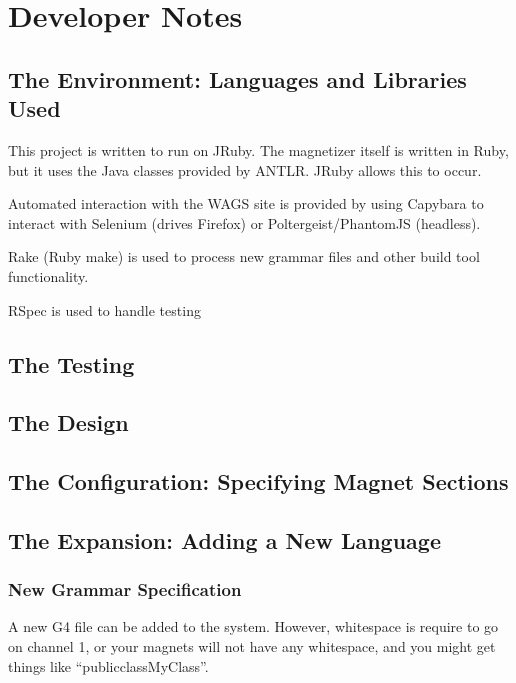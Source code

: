\documentclass[letter,10pt]{article}
\begin{document}
\section{Developer Notes}

\subsection{The Environment: Languages and Libraries Used}


This project is written to run on JRuby. The magnetizer itself is 
written in Ruby, but it uses the Java classes provided by ANTLR. JRuby 
allows this to occur.

Automated interaction with the WAGS site is provided by using Capybara 
to interact with Selenium (drives Firefox) or Poltergeist/PhantomJS 
(headless).

Rake (Ruby make) is used to process new grammar files and other build 
tool functionality.

RSpec is used to handle testing

\subsection{The Testing}

\subsection{The Design}

\subsection{The Configuration: Specifying Magnet Sections}

\subsection{The Expansion: Adding a New Language}
\label{sec:newLang}

\subsubsection{New Grammar Specification}
A new G4 file can be added to the system. However, whitespace is
require to go on channel 1, or your magnets will not have any
whitespace, and you might get things like ``publicclassMyClass''.


{}

\end{document}
